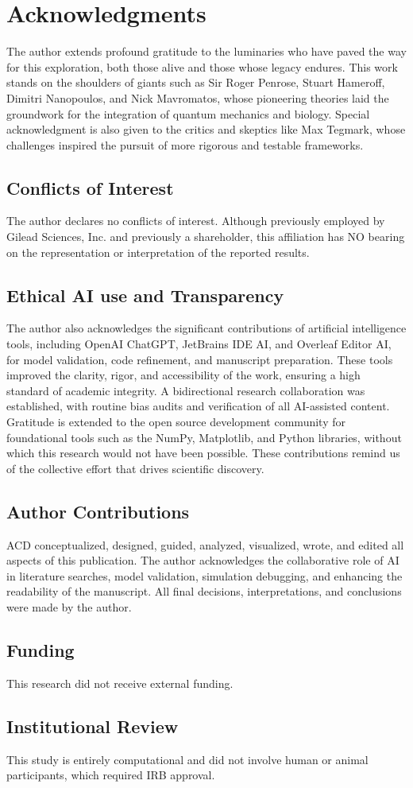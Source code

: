 \section{Acknowledgments} 
The author extends profound gratitude to the luminaries who have paved the way for this exploration, both those alive and those whose legacy endures. This work stands on the shoulders of giants such as Sir Roger Penrose, Stuart Hameroff, Dimitri Nanopoulos, and Nick Mavromatos, whose pioneering theories laid the groundwork for the integration of quantum mechanics and biology. Special acknowledgment is also given to the critics and skeptics like Max Tegmark, whose challenges inspired the pursuit of more rigorous and testable frameworks. 
\subsection{Conflicts of Interest} 
The author declares no conflicts of interest. Although previously employed by Gilead Sciences, Inc. and previously a shareholder, this affiliation has NO bearing on the representation or interpretation of the reported results.  
\subsection{Ethical AI use and Transparency} 
The author also acknowledges the significant contributions of artificial intelligence tools, including OpenAI ChatGPT, JetBrains IDE AI, and Overleaf Editor AI, for model validation, code refinement, and manuscript preparation. These tools improved the clarity, rigor, and accessibility of the work, ensuring a high standard of academic integrity. A bidirectional research collaboration was established, with routine bias audits and verification of all AI-assisted content.
Gratitude is extended to the open source development community for foundational tools such as the NumPy, Matplotlib, and Python libraries, without which this research would not have been possible. 
These contributions remind us of the collective effort that drives scientific discovery. 
\subsection{Author Contributions} 
ACD conceptualized, designed, guided, analyzed, visualized, wrote, and edited all aspects of this publication. The author acknowledges the collaborative role of AI in literature searches, model validation, simulation debugging, and enhancing the readability of the manuscript. All final decisions, interpretations, and conclusions were made by the author. 
\subsection{Funding} 
This research did not receive external funding. 
\subsection{Institutional Review} 
This study is entirely computational and did not involve human or animal participants, which required IRB approval. 